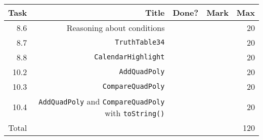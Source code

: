 \newcommand{\class}[1]{\texttt{#1}}
\newcommand{\method}[2]{\texttt{#2()}}
\\ \\ \\ \noindent\parbox[l]{\textwidth}{
 \\ \\
\begin{tabular}{||r|r|r|r|r||} \hline \hline
Task  & Title                            & Done? & Mark & Max \\ \hline
8.6 & Reasoning about conditions & & & 20 \\ \hline
8.7 & \class{TruthTable34} & & & 20 \\ \hline
8.8 & \class{CalendarHighlight} & & & 20 \\ \hline
10.2 & \class{AddQuadPoly} & & & 20 \\ \hline
10.3 & \class{CompareQuadPoly} & & & 20 \\ \hline
10.4 & \class{AddQuadPoly} and \class{CompareQuadPoly} with \method{Object}{toString} & & & 20 \\ \hline
\hline
Total &                                  &       &      & 120 \\ \hline
\hline
\end{tabular} \\ \\
}
